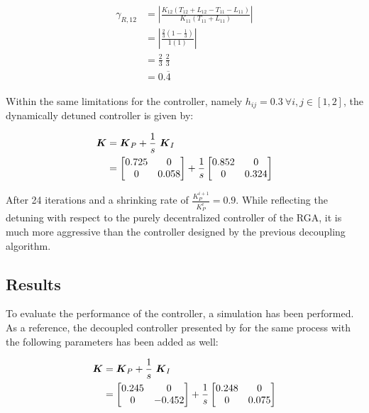 \begin{align*}
\begin{split}
\gamma_{R,12} &= \left|\frac{K_{12} \left( T_{12} + L_{12}  - T_{11} - L_{11} \right)}{K_{11} \left( T_{11} + L_{11}\right)} \right| \\
&= \left|\frac{\frac{2}{3} \left( 1  - \frac{1}{3} \right)}{1 \left( 1\right)} \right| \\
&= \frac{2}{3} ~\frac{2}{3}\\
&= 0.\overline{4}
\end{split}
\end{align*}

Within the same limitations for the controller, namely $h_{ij} = 0.3 ~ \forall i,j \in [1,2]$, the dynamically detuned controller is given by:

\begin{align*}
\mbox{\boldmath$K$} &= \mbox{\boldmath$K$}_P + \frac{1}{s}~ \mbox{\boldmath$K$}_I\\
&= \begin{bmatrix}
0.725 & 0 \\
0 & 0.058
\end{bmatrix}
+ \frac{1}{s}\begin{bmatrix}
0.852 & 0 \\
0 & 0.324
\end{bmatrix}
\end{align*}

After 24 iterations and a shrinking rate of $\frac{K_P^{i+1}}{K_P^{i}} = 0.9 $. While reflecting the detuning with respect to the purely decentralized controller of the RGA, it is much more aggressive than the controller designed by the previous decoupling algorithm. \\

\subsection{Results}
\label{c:fotd:s:rosenbrocks:ss:results}

To evaluate the performance of the controller, a simulation has been performed. As a reference, the decoupled controller presented by \cite{Astrom2001a} for the same process with the following parameters has been added as well:

\begin{align*}
\mbox{\boldmath$K$} &= \mbox{\boldmath$K$}_P + \frac{1}{s}~ \mbox{\boldmath$K$}_I\\
&= \begin{bmatrix}
0.245 & 0 \\
0 & -0.452
\end{bmatrix}
+ \frac{1}{s}\begin{bmatrix}
0.248 & 0 \\
0 & 0.075
\end{bmatrix}
\end{align*}

